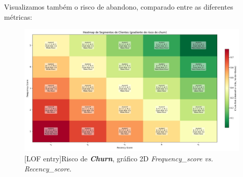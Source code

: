 \documentclass{easychair}
\begin{document}
Visualizamos também o risco de abandono, comparado entre as diferentes métricas:

\begin{figure}[H]
    \begin{centering}
    \includegraphics[width=1\linewidth]{imagens/figure26.jpg}\label{cap-5-fig26}
    [LOF entry]{Risco de \textbf{\textit{Churn}}, gráfico 2D \textit{Frequency_score vs. Recency_score}.}
    \label{fig26}
    \end{centering}
\end{figure}
\end{document}

